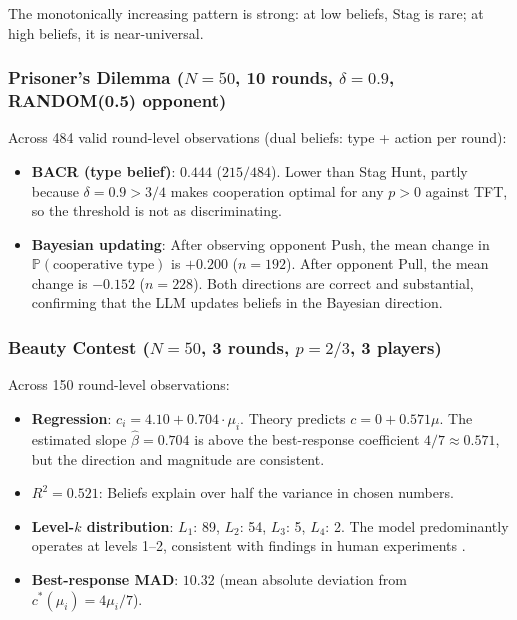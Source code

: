 \documentclass[12pt]{article}
\newcommand{\Prob}{\mathbb{P}}
\begin{document}
The monotonically increasing pattern is strong: at low beliefs, Stag is rare; at high beliefs, it is near-universal.

\subsubsection{Prisoner's Dilemma ($N=50$, 10 rounds, $\delta=0.9$, RANDOM(0.5) opponent)}

Across 484 valid round-level observations (dual beliefs: type + action per round):

\begin{itemize}[nosep]
    \item \textbf{BACR (type belief)}: $0.444$ ($215/484$). Lower than Stag Hunt, partly because $\delta=0.9 > 3/4$ makes cooperation optimal for any $p>0$ against TFT, so the threshold is not as discriminating.
    \item \textbf{Bayesian updating}: After observing opponent Push, the mean change in $\Prob(\text{cooperative type})$ is $+0.200$ ($n=192$). After opponent Pull, the mean change is $-0.152$ ($n=228$). Both directions are correct and substantial, confirming that the LLM updates beliefs in the Bayesian direction.
\end{itemize}

\subsubsection{Beauty Contest ($N=50$, 3 rounds, $p=2/3$, 3 players)}

Across 150 round-level observations:

\begin{itemize}[nosep]
    \item \textbf{Regression}: $c_i = 4.10 + 0.704 \cdot \mu_i$. Theory predicts $c = 0 + 0.571\mu$. The estimated slope $\hat\beta = 0.704$ is above the best-response coefficient $4/7 \approx 0.571$, but the direction and magnitude are consistent.
    \item \textbf{$R^2 = 0.521$}: Beliefs explain over half the variance in chosen numbers.
    \item \textbf{Level-$k$ distribution}: $L_1$: 89, $L_2$: 54, $L_3$: 5, $L_4$: 2. The model predominantly operates at levels 1--2, consistent with findings in human experiments \citep{nagel1995unraveling}.
    \item \textbf{Best-response MAD}: $10.32$ (mean absolute deviation from $c^*(\mu_i) = 4\mu_i/7$).
\end{itemize}
\end{document}
